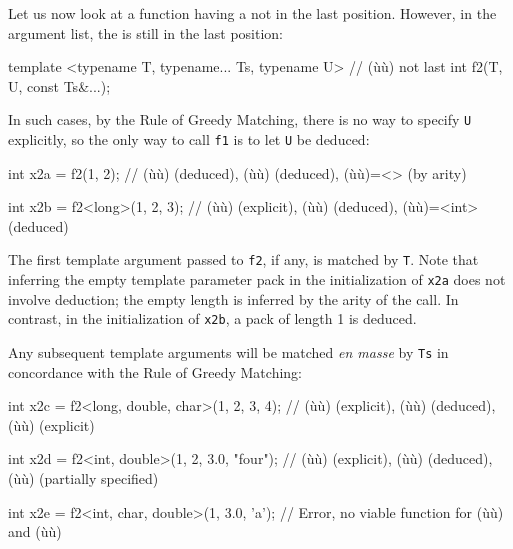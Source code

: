 \noindent Let us now look at a function having a 
not in the last position. However, in the argument list, the
 is still in the last position:

\begin{emcppslisting}[emcppsbatch=e18]
template <typename T, typename... Ts, typename U>  // (ù{}ù) not last
int f2(T, U, const Ts&...);
\end{emcppslisting}
    

\noindent In such cases, by the Rule of Greedy Matching, there is no way to
specify \lstinline!U! explicitly, so the only way to call \lstinline!f1! is to
let \lstinline!U! be deduced:

\begin{emcppslisting}[emcppsbatch=e18]
int x2a = f2(1, 2);
    // (ù{}ù) (deduced), (ù{}ù) (deduced), (ù{}ù)=<> (by arity)

int x2b = f2<long>(1, 2, 3);
    // (ù{}ù) (explicit), (ù{}ù) (deduced), (ù{}ù)=<int> (deduced)
\end{emcppslisting}
    

\noindent The first template argument passed to \lstinline!f2!, if any, is matched by
\lstinline!T!. Note that inferring the empty template parameter pack in the
initialization of \lstinline!x2a! does not involve deduction; the empty
length is inferred by the arity of the call. In contrast, in the
initialization of \lstinline!x2b!, a pack of length 1 is deduced.

Any subsequent template arguments will be matched \emph{en masse} by
\lstinline!Ts! in concordance with the Rule of Greedy Matching:

\begin{emcppslisting}[emcppsbatch=e18]
int x2c = f2<long, double, char>(1, 2, 3, 4);
    // (ù{}ù) (explicit), (ù{}ù) (deduced), (ù{}ù) (explicit)

int x2d = f2<int, double>(1, 2, 3.0, "four");
    // (ù{}ù) (explicit), (ù{}ù) (deduced), (ù{}ù) (partially specified)

int x2e = f2<int, char, double>(1, 3.0, 'a');
    // Error, no viable function for (ù{}ù) and (ù{}ù)
\end{emcppslisting}
    

